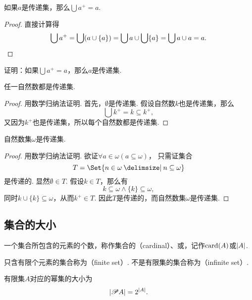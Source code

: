 \begin{theorem}
如果\(a\)是传递集，那么\(\bigcup a^+ = a\).
\begin{proof}
直接计算得\[
\bigcup a^+
= \bigcup (a \cup \{a\})
= \bigcup a \cup \bigcup\{a\}
= \bigcup a \cup a
= a.
\qedhere
\]
\end{proof}
\end{theorem}

\begin{example}
证明：如果\(\bigcup a^+ = a\)，那么\(a\)是传递集.
\end{example}

\begin{theorem}
任一自然数都是传递集.
\begin{proof}
用数学归纳法证明.
首先，\(\emptyset\)是传递集.
假设自然数\(k\)也是传递集，那么\[
\bigcup k^+ = k \subseteq k^+,
\]又因为\(k^+\)也是传递集，所以每个自然数都是传递集.
\end{proof}
\end{theorem}

\begin{theorem}
自然数集\(\omega\)是传递集.
\begin{proof}
用数学归纳法证明.
欲证\(\forall a \in \omega ( a \subseteq \omega )\)，%
只需证集合\[
T = \Set{n \in \omega \given n \subseteq \omega}
\]是传递的.
显然\(\emptyset \in T\).
假设\(k \in T\)，那么有\[
k \subseteq \omega
\land
\{k\} \subseteq \omega,
\]同时\(k \cup \{k\} \subseteq \omega\)，从而\(k^+ \in T\).
因此\(T\)是传递的，而自然数集\(\omega\)是传递集.
\end{proof}
\end{theorem}


\subsection{集合的大小}
\begin{definition}
一个集合所包含的元素的个数，称作集合的（cardinal）、或，记作\(\operatorname{card}(A)\)或\(\abs{A}\).
\end{definition}

\begin{definition}
只含有限个元素的集合称为（finite set）.
不是有限集的集合称为（infinite set）.
\end{definition}

\begin{property}
有限集\(A\)对应的幂集的大小为\[
\abs{\mathscr{P} A} = 2^{\abs{A}}.
\]
\end{property}

